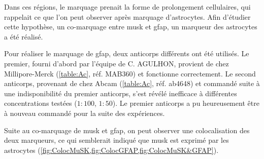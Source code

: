 	Dans ces régions, le marquage prenait la forme de prolongement cellulaires, qui rappelait ce que l'on peut observer après marquage d'astrocytes. Afin d'étudier cette hypothèse, un co-marquage entre \gls{musk} et \gls{gfap}, un marqueur des astrocytes a été réalisé.
	
	Pour réaliser le marquage de \gls{gfap}, deux anticorps différents ont été utilisés. Le premier, fourni d'abord par l'équipe de C. AGULHON, provient de chez Millipore-Merck (\cref{table:Ac}, réf. MAB360) et fonctionne correctement. Le second anticorps, provenant de chez Abcam (\cref{table:Ac}, réf. ab4648) et commandé suite à une indisponibilité du premier anticorps, s'est révélé inefficace à différentes concentrations testées ($1{:}100$, $1{:}50$). Le premier anticorps a pu heureusement être à nouveau commandé pour la suite des expériences.
	
	Suite au co-marquage de \gls{musk} et \gls{gfap}, on peut observer une colocalisation des deux marqueurs, ce qui semblerait indiqué que \gls{musk} est exprimé par les astrocytes (\cref{fig:ColocMuSK,fig:ColocGFAP,fig:ColocMuSK&GFAP}).
	
